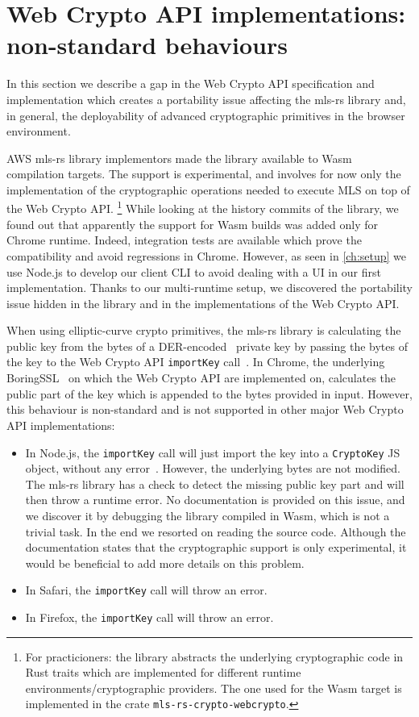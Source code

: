 \section{Web Crypto API implementations: non-standard behaviours}\label{sc:Web-Crypto-API-implementations:-non-standard-behaviours}

In this section we describe a gap in the Web Crypto API specification and
implementation which creates a portability issue affecting the mls-rs library
and, in general, the deployability of advanced cryptographic primitives
in the browser environment.

AWS mls-rs library implementors made the library available to Wasm compilation
targets. The support is experimental, and involves for now only the implementation
of the cryptographic operations needed to execute MLS on top of the Web Crypto API.
\footnote{For practicioners: the library abstracts the underlying cryptographic code in Rust traits which are implemented for different runtime environments/cryptographic providers. The one used for the Wasm target is implemented in the crate \texttt{mls-rs-crypto-webcrypto}.}
While looking at the history commits of the library, we found out that
apparently the support for Wasm builds was added only for Chrome runtime.
Indeed, integration tests are available
which prove the compatibility and avoid regressions in Chrome.
However, as seen in \cref{ch:setup} we use Node.js to develop our client
CLI to avoid dealing with a UI in our first implementation.
Thanks to our multi-runtime setup, we discovered the portability issue
hidden in the library and in the implementations of the Web Crypto API.

When using elliptic-curve crypto primitives, the mls-rs library is 
calculating the public key from the bytes of a DER-encoded~\cite{Kaliski2002ALG} private key 
by passing the bytes of the key to the Web Crypto API \texttt{importKey}
call~\cite{WebCryptoAPIImportKey}. In Chrome, the underlying BoringSSL~\cite{BoringSSL} on which the Web Crypto API 
are implemented on, calculates
the public part of the key which is appended to the bytes provided in input.
However, this behaviour is non-standard and is not supported in other
major Web Crypto API implementations:
\begin{itemize}
    \item In Node.js, the \texttt{importKey} call will just import the key into a \texttt{CryptoKey} JS object, without any error~\cite{WebCryptoAPICryptoKey}. However, the underlying bytes are not modified. The mls-rs library has a check to detect the missing public key part and will then throw a runtime error. No documentation is provided on this issue, and we discover it by debugging the library compiled in Wasm, which is not a trivial task. In the end we resorted on reading the source code. Although the documentation states that the cryptographic support is only experimental, it would be beneficial to add more details on this problem.
    \item In Safari, the \texttt{importKey} call will throw an error.
    \item In Firefox, the \texttt{importKey} call will throw an error.
\end{itemize}

